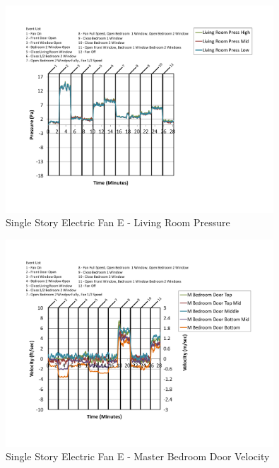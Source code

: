 \documentclass{article}
\begin{document}
\begin{appendices}
	\begin{figure}[H]
		\centering
		\includegraphics[height=3.05in,trim=0.67in 1.1in 0.67in 0.8in,clip=true]{0_Images/Results_Charts/ColdFlow/Single_Story/Electric/E/Living_Room_Pressure.pdf}
		\caption{Single Story Electric Fan E - Living Room Pressure}
	\end{figure}
 

	\begin{figure}[H]
		\centering
		\includegraphics[height=3.05in,trim=0.67in 1.1in 0.67in 0.8in,clip=true]{0_Images/Results_Charts/ColdFlow/Single_Story/Electric/E/Master_Bedroom_Door_Velocity.pdf}
		\caption{Single Story Electric Fan E - Master Bedroom Door Velocity}
	\end{figure}
 
	\clearpage


\end{appendices}
\end{document}
